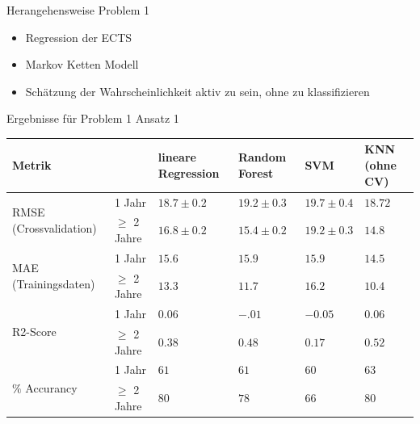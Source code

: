 \documentclass[17pt, fleqn]{beamer}
\begin{document}
\begin{frame}{Herangehensweise Problem 1}
    \begin{itemize}
        \item Regression der ECTS \\[1cm]
        \pause
        \item Markov Ketten Modell \\[1cm]
        \pause
        \item Schätzung der Wahrscheinlichkeit aktiv zu sein, ohne zu klassifizieren
    \end{itemize}
    
\end{frame}

\begin{frame}{Ergebnisse für Problem 1 Ansatz 1}
    \scriptsize{
    \begin{table}[ht]
        \begin{tabular}{ p{2cm} p{1cm} p{1cm} p{1cm} p{1cm} p{1cm} }
          Metrik &               & lineare Regression & Random Forest  & SVM            & KNN (ohne CV) \\
          \hline
          \multirow{2}{3em}{RMSE (Crossvalidation)}
                 & 1 Jahr        & $18.7 \pm 0.2$     & $19.2 \pm 0.3$ & $19.7 \pm 0.4$ & $18.72$       \\
                 & $\geq$ 2 Jahre & $16.8 \pm 0.2$     & $15.4 \pm 0.2$ & $19.2 \pm 0.3$ & $14.8$        \\
      
          \hline
          \multirow{2}{3em}{MAE (Trainingsdaten)}
                 & 1 Jahr        & $15.6$             & $15.9$         & $15.9$         & $14.5$        \\
                 & $\geq$ 2 Jahre & $13.3$             & $11.7$         & $16.2$         & $10.4$        \\
      
          \hline
          \multirow{2}{3em}{R2-Score}
                 & 1 Jahr        & $0.06$             & $-.01$         & $-0.05$        & $0.06$        \\
                 & $\geq$ 2 Jahre & $0.38$             & $0.48$         & $0.17$         & $0.52$        \\
      
          \hline
          \multirow{2}{3em}{$\%$ Accurancy}
                 & 1 Jahr        & $61$               & $61$           & $60$           & $63$          \\
                 & $\geq$ 2 Jahre & $80$               & $78$           & $66$           & $80$          \\
      
          \hline
        \end{tabular}
      \end{table}
    }
    
\end{frame}
\end{document}
